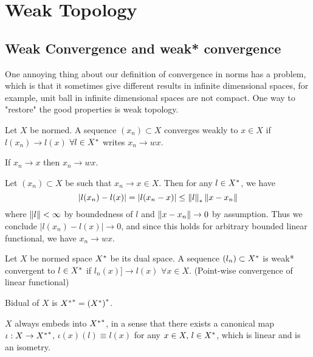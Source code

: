\newpage
\section{Weak Topology}
\subsection{Weak Convergence and weak* convergence}
One annoying thing about our definition of convergence in norms has a problem, which is that it sometimes give different results in infinite dimensional spaces, for example, unit ball in infinite dimensional spaces are not compact. One way to "restore" the good properties is weak topology.
\begin{definition}\nl
Let $X$ be normed. A sequence $(x_n)\subset X$ converges weakly to $x\in X$ if $l(x_n) \to l(x)$ $\forall l\in {X}^*$ writes $x_n\rightarrow{w} x$.    
\end{definition}

\begin{proposition}\nl
    If $x_n\to x$ then $x_n\rightarrow{w}x$.
    \begin{pf}{}{}
    Let $(x_n)\subset X$ be such that $x_n\to x\in X$. Then for any $l\in{X}^*$, we have
    $$|l(x_n)-l(x)|=|l(x_n-x)|\leq\left\|{l}\right\|_*\left\|{x-x_n}\right\|$$
    where $\left\|{l}\right\|<\infty$ by boundedness of $l$ and $\left\|{x-x_n}\right\|\to 0$ by assumption. Thus we conclude $|l(x_n)-l(x)|\to0$, and since this holds for arbitrary bounded linear functional, we have $x_n\rightarrow{w}x$.
    \end{pf}
\end{proposition}

\begin{definition}\nl
Let $X$ be normed space ${X}^*$ be its dual space. A sequence $(l_n)\subset {X}^*$ is weak* convergent to $l\in {X}^*$ if $l_n(x)]\to l(x)\,\,\forall x\in X$. (Point-wise convergence of linear functional)
\end{definition}

\begin{definition}[Bidual]\nl
Bidual of $X$ is ${{X}^*}^*={({X}^*)}^*$. 
\end{definition}

\begin{proposition}\nl
$X$ always embeds into ${{X}^*}^*$, in a sense that there exists a canonical map $\iota: X\to{{X}^*}^*$, $\iota(x)(l)\equiv l(x)$ for any $x\in X,\, l\in{X}^*$, which is linear and is an isometry.
\end{proposition}

